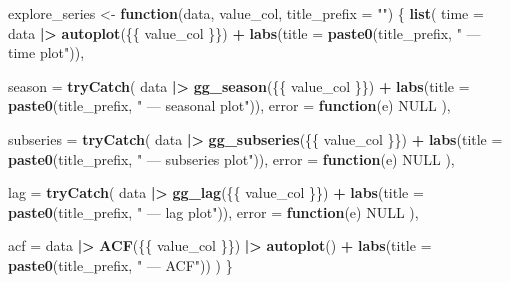 \documentclass[
  11pt,
]{article}
\newenvironment{Shaded}{\begin{snugshade}}{\end{snugshade}}
\newcommand{\AttributeTok}[1]{\textcolor[rgb]{0.13,0.29,0.53}{#1}}
\newcommand{\ConstantTok}[1]{\textcolor[rgb]{0.56,0.35,0.01}{#1}}
\newcommand{\ControlFlowTok}[1]{\textcolor[rgb]{0.13,0.29,0.53}{\textbf{#1}}}
\newcommand{\FunctionTok}[1]{\textcolor[rgb]{0.13,0.29,0.53}{\textbf{#1}}}
\newcommand{\NormalTok}[1]{#1}
\newcommand{\OtherTok}[1]{\textcolor[rgb]{0.56,0.35,0.01}{#1}}
\newcommand{\SpecialCharTok}[1]{\textcolor[rgb]{0.81,0.36,0.00}{\textbf{#1}}}
\newcommand{\StringTok}[1]{\textcolor[rgb]{0.31,0.60,0.02}{#1}}
\begin{document}
\begin{Shaded}
\begin{Highlighting}[]
\NormalTok{explore\_series }\OtherTok{\textless{}{-}} \ControlFlowTok{function}\NormalTok{(data, value\_col, }\AttributeTok{title\_prefix =} \StringTok{""}\NormalTok{) \{}
  \FunctionTok{list}\NormalTok{(}
    \AttributeTok{time =}\NormalTok{ data }\SpecialCharTok{|\textgreater{}} \FunctionTok{autoplot}\NormalTok{(\{\{ value\_col \}\}) }\SpecialCharTok{+}
      \FunctionTok{labs}\NormalTok{(}\AttributeTok{title =} \FunctionTok{paste0}\NormalTok{(title\_prefix, }\StringTok{" — time plot"}\NormalTok{)),}

    \AttributeTok{season =} \FunctionTok{tryCatch}\NormalTok{(}
\NormalTok{      data }\SpecialCharTok{|\textgreater{}} \FunctionTok{gg\_season}\NormalTok{(\{\{ value\_col \}\}) }\SpecialCharTok{+} \FunctionTok{labs}\NormalTok{(}\AttributeTok{title =} \FunctionTok{paste0}\NormalTok{(title\_prefix, }\StringTok{" — seasonal plot"}\NormalTok{)),}
      \AttributeTok{error =} \ControlFlowTok{function}\NormalTok{(e) }\ConstantTok{NULL}
\NormalTok{    ),}

    \AttributeTok{subseries =} \FunctionTok{tryCatch}\NormalTok{(}
\NormalTok{      data }\SpecialCharTok{|\textgreater{}} \FunctionTok{gg\_subseries}\NormalTok{(\{\{ value\_col \}\}) }\SpecialCharTok{+} \FunctionTok{labs}\NormalTok{(}\AttributeTok{title =} \FunctionTok{paste0}\NormalTok{(title\_prefix, }\StringTok{" — subseries plot"}\NormalTok{)),}
      \AttributeTok{error =} \ControlFlowTok{function}\NormalTok{(e) }\ConstantTok{NULL}
\NormalTok{    ),}

    \AttributeTok{lag =} \FunctionTok{tryCatch}\NormalTok{(}
\NormalTok{      data }\SpecialCharTok{|\textgreater{}} \FunctionTok{gg\_lag}\NormalTok{(\{\{ value\_col \}\}) }\SpecialCharTok{+} \FunctionTok{labs}\NormalTok{(}\AttributeTok{title =} \FunctionTok{paste0}\NormalTok{(title\_prefix, }\StringTok{" — lag plot"}\NormalTok{)),}
      \AttributeTok{error =} \ControlFlowTok{function}\NormalTok{(e) }\ConstantTok{NULL}
\NormalTok{    ),}

    \AttributeTok{acf =}\NormalTok{ data }\SpecialCharTok{|\textgreater{}} \FunctionTok{ACF}\NormalTok{(\{\{ value\_col \}\}) }\SpecialCharTok{|\textgreater{}} \FunctionTok{autoplot}\NormalTok{() }\SpecialCharTok{+}
      \FunctionTok{labs}\NormalTok{(}\AttributeTok{title =} \FunctionTok{paste0}\NormalTok{(title\_prefix, }\StringTok{" — ACF"}\NormalTok{))}
\NormalTok{  )}
\NormalTok{\}}
\end{Highlighting}
\end{Shaded}
\end{document}
